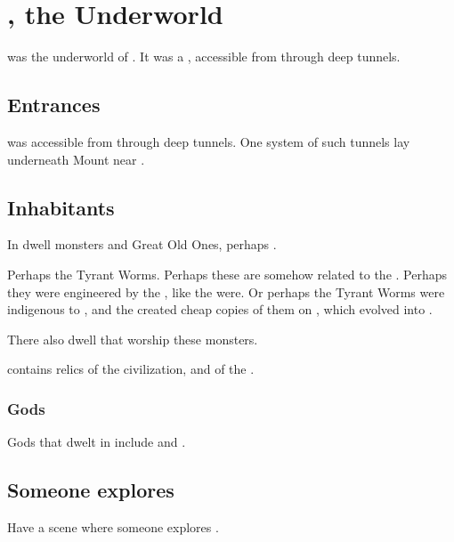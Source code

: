 \section{\KaiLeng, the Underworld}
\index{\KaiLeng}
\KaiLeng{} was the underworld of \Miith{}. 
It was a , accessible from \Azmith{} through deep tunnels. 









\subsection{Entrances}
\KaiLeng was accessible from \Azmith{} through deep tunnels. 
One system of such tunnels lay underneath Mount  near . 









\subsection{Inhabitants}
In \KaiLeng dwell monsters and Great Old Ones, perhaps \xss. 

Perhaps the Tyrant Worms. 
Perhaps these are somehow related to the . 
Perhaps they were engineered by the \voyagers, like the \banes{} were. 
Or perhaps the Tyrant Worms were indigenous to \Miith{}, and the \voyagers{} created cheap copies of them on \Erebos, which evolved into \ghobaleth. 

There also dwell  that worship these monsters. 

\KaiLeng{} contains relics of the \psp{\voyagers} civilization, and of the \xss. 





\subsubsection{Gods}
Gods that dwelt in \KaiLeng include  and . 









\subsection{Someone explores \KaiLeng}
Have a scene where someone explores \KaiLeng. 

